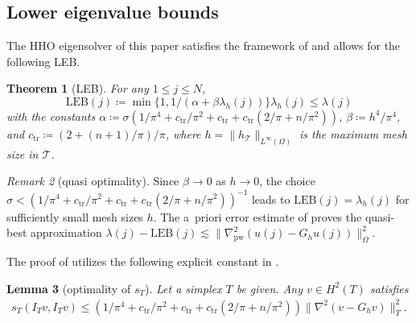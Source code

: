 \documentclass[a4paper]{amsart}
\numberwithin{equation}{section}
\def\T{\mathcal{T}}
\def\pw{\mathrm{pw}}
\newtheorem{theorem}{Theorem}[section]
\newtheorem{lemma}[theorem]{Lemma}
\theoremstyle{definition}
\theoremstyle{remark}
\newtheorem{remark}[theorem]{Remark}
\numberwithin{theorem}{section}
\numberwithin{equation}{section}
\numberwithin{table}{section}
\numberwithin{figure}{section}
\begin{document}
\subsection{Lower eigenvalue bounds}\label{sec:LEB}
The HHO eigensolver of this paper satisfies the framework of \cite{CarstensenZhaiZhang2020,Tran2024x2} and allows for the following LEB.
\begin{theorem}[LEB]\label{thm:LEB}
    For any $1 \leq j \leq N$,
    \begin{equation*}
        \mathrm{LEB}(j) \coloneqq \min\{1,1/(\alpha +\beta\lambda_h(j))\}\lambda_h(j) \leq\lambda(j)
    \end{equation*}
    with the constants $\alpha \coloneqq \sigma(1/\pi^4 + c_\mathrm{tr}/\pi^2 + c_\mathrm{tr} + c_\mathrm{tr}(2/\pi + n/\pi^2))$, $\beta \coloneqq h^4/\pi^4$,
    and $c_\mathrm{tr} \coloneqq (2+(n+1)/\pi)/\pi$, where $h = \|h_\T\|_{L^\infty(\Omega)}$ is the maximum mesh size in $\T$.
\end{theorem}
\begin{remark}[quasi optimality]\label{rem:direct-LEB}
    Since $\beta \to 0$ as $h \to 0$, the choice $\sigma < (1/\pi^4 + c_\mathrm{tr}/\pi^2 + c_\mathrm{tr} + c_\mathrm{tr}(2/\pi + n/\pi^2))^{-1}$ leads to $\mathrm{LEB}(j) = \lambda_h(j)$ for sufficiently small mesh sizes $h$. The a~priori error estimate of  proves the quasi-best approximation $\lambda(j) - \mathrm{LEB}(j) \lesssim \|\nabla_\pw^2(u(j) - G_h u(j))\|_\Omega^2$.
\end{remark}
The proof of  utilizes the following explicit constant in .
\begin{lemma}[optimality of $s_T$]\label{lem:best-appr-stab-eig}
    Let a simplex $T$ be given. Any $v \in H^2(T)$ satisfies
    \begin{align*}
        s_T(I_T v, I_T v) \leq (1/\pi^4 + c_\mathrm{tr}/\pi^2 + c_\mathrm{tr} + c_\mathrm{tr}(2/\pi + n/\pi^2)) \|\nabla^2(v - G_h v)\|_T^2.
    \end{align*}
\end{lemma}
\end{document}

